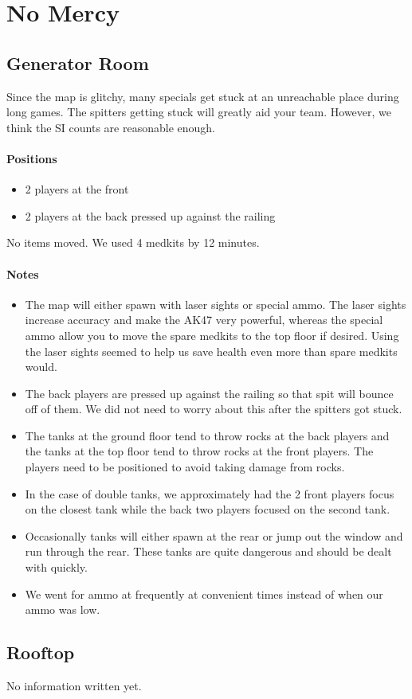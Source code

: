 \section{No Mercy}

\subsection{Generator Room}
Since the map is glitchy, many specials get stuck at an unreachable place during long games. The spitters getting stuck will greatly aid your team. However, we think the SI counts are reasonable enough.

\paragraph{Positions}
\begin{itemize}
\item 2 players at the front
\item 2 players at the back pressed up against the railing
\end{itemize}

No items moved. We used 4 medkits by 12 minutes.

\paragraph{Notes}
\begin{itemize}
\item The map will either spawn with laser sights or special ammo. The laser sights increase accuracy and make the AK47 very powerful, whereas the special ammo allow you to move the spare medkits to the top floor if desired. Using the laser sights seemed to help us save health even more than spare medkits would.
\item The back players are pressed up against the railing so that spit will bounce off of them. We did not need to worry about this after the spitters got stuck.
\item The tanks at the ground floor tend to throw rocks at the back players and the tanks at the top floor tend to throw rocks at the front players. The players need to be positioned to avoid taking damage from rocks.
\item In the case of double tanks, we approximately had the 2 front players focus on the closest tank while the back two players focused on the second tank.
\item Occasionally tanks will either spawn at the rear or jump out the window and run through the rear. These tanks are quite dangerous and should be dealt with quickly.
\item We went for ammo at frequently at convenient times instead of when our ammo was low.
\end{itemize}

\subsection{Rooftop}
No information written yet.
